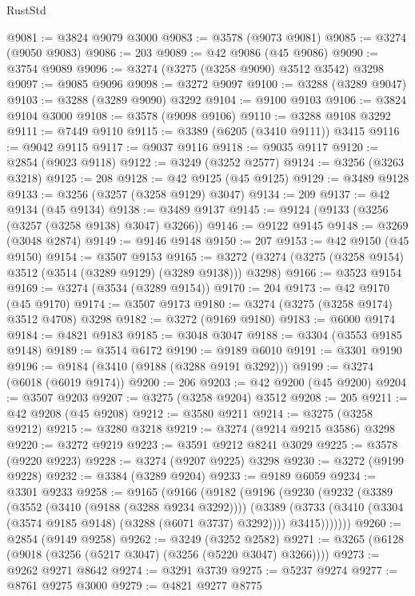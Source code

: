 \begin{lexlean}{RustStd}
\begin{coremodule}
@9081 := @3824 @9079 @3000
@9083 := @3578 (@9073 @9081)
@9085 := @3274 (@9050 @9083)
@9086 := 203
@9089 := @42 @9086 (@45 @9086)
@9090 := @3754 @9089
@9096 := @3274 (@3275 (@3258 @9090) @3512 @3542) @3298
@9097 := @9085 @9096
@9098 := @3272 @9097
@9100 := @3288 (@3289 @9047)
@9103 := @3288 (@3289 @9090) @3292
@9104 := @9100 @9103
@9106 := @3824 @9104 @3000
@9108 := @3578 (@9098 @9106)
@9110 := @3288 @9108 @3292
@9111 := @7449 @9110
@9115 := @3389 (@6205 (@3410 @9111)) @3415
@9116 := @9042 @9115
@9117 := @9037 @9116
@9118 := @9035 @9117
@9120 := @2854 (@9023 @9118)
@9122 := @3249 (@3252 @2577)
@9124 := @3256 (@3263 @3218)
@9125 := 208
@9128 := @42 @9125 (@45 @9125)
@9129 := @3489 @9128
@9133 := @3256 (@3257 (@3258 @9129) @3047)
@9134 := 209
@9137 := @42 @9134 (@45 @9134)
@9138 := @3489 @9137
@9145 := @9124 (@9133 (@3256 (@3257 (@3258 @9138) @3047) @3266))
@9146 := @9122 @9145
@9148 := @3269 (@3048 @2874)
@9149 := @9146 @9148
@9150 := 207
@9153 := @42 @9150 (@45 @9150)
@9154 := @3507 @9153
@9165 := @3272 (@3274 (@3275 (@3258 @9154) @3512 (@3514 (@3289 @9129) (@3289 @9138))) @3298)
@9166 := @3523 @9154
@9169 := @3274 (@3534 (@3289 @9154))
@9170 := 204
@9173 := @42 @9170 (@45 @9170)
@9174 := @3507 @9173
@9180 := @3274 (@3275 (@3258 @9174) @3512 @4708) @3298
@9182 := @3272 (@9169 @9180)
@9183 := @6000 @9174
@9184 := @4821 @9183
@9185 := @3048 @3047
@9188 := @3304 (@3553 @9185 @9148)
@9189 := @3514 @6172
@9190 := @9189 @6010
@9191 := @3301 @9190
@9196 := @9184 (@3410 (@9188 (@3288 @9191 @3292)))
@9199 := @3274 (@6018 (@6019 @9174))
@9200 := 206
@9203 := @42 @9200 (@45 @9200)
@9204 := @3507 @9203
@9207 := @3275 (@3258 @9204) @3512
@9208 := 205
@9211 := @42 @9208 (@45 @9208)
@9212 := @3580 @9211
@9214 := @3275 (@3258 @9212)
@9215 := @3280 @3218
@9219 := @3274 (@9214 @9215 @3586) @3298
@9220 := @3272 @9219
@9223 := @3591 @9212 @8241 @3029
@9225 := @3578 (@9220 @9223)
@9228 := @3274 (@9207 @9225) @3298
@9230 := @3272 (@9199 @9228)
@9232 := @3384 (@3289 @9204)
@9233 := @9189 @6059
@9234 := @3301 @9233
@9258 := @9165
    (@9166
      (@9182
        (@9196
          (@9230
            (@9232
              (@3389
                (@3552 (@3410 (@9188 (@3288 @9234 @3292))))
                (@3389
                  (@3733 (@3410 (@3304 (@3574 @9185 @9148) (@3288 (@6071 @3737) @3292))))
                  @3415)))))))
@9260 := @2854 (@9149 @9258)
@9262 := @3249 (@3252 @2582)
@9271 := @3265 (@6128 (@9018 (@3256 (@5217 @3047) (@3256 (@5220 @3047) @3266))))
@9273 := @9262 @9271 @8642
@9274 := @3291 @3739
@9275 := @5237 @9274
@9277 := @8761 @9275 @3000
@9279 := @4821 @9277 @8775

\end{coremodule}
\end{lexlean}

